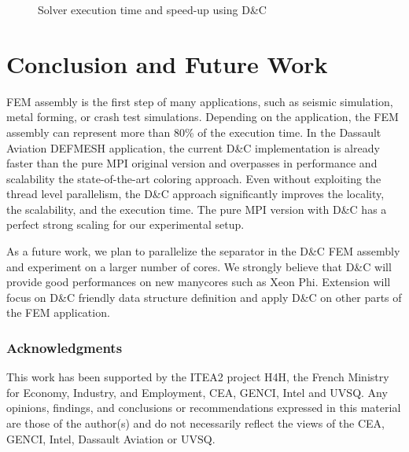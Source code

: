 \documentclass[10pt]{IOS-Book-Article}
\begin{document}
\begin{figure}[htp]
 \caption{Solver execution time and speed-up using D\&C}
 \label{fig:solCurves}
\end{figure}

\section{Conclusion and Future Work}
FEM assembly is the first step of many applications, such as seismic simulation, metal forming, or crash test simulations.
Depending on the application, the FEM assembly can represent more than 80\% of the execution time.
In the Dassault Aviation DEFMESH application, the current D\&C implementation is already faster than the pure MPI original version and overpasses in performance and scalability the state-of-the-art coloring approach.
Even without exploiting the thread level parallelism, the D\&C approach  significantly improves the locality, the scalability, and the execution time.
The pure MPI version with D\&C has a perfect strong scaling for our experimental setup.

As a future work, we plan to parallelize the separator in the D\&C FEM assembly and experiment on a larger number of cores.
We strongly believe that D\&C will provide good performances on new manycores such as Xeon Phi.
Extension will focus on D\&C friendly data structure definition and apply D\&C on other parts of the FEM application. 

\subsubsection*{Acknowledgments} \scriptsize{
This work has been supported by the ITEA2 project H4H, the French Ministry for Economy,
Industry, and Employment, CEA, GENCI, Intel and UVSQ.  Any opinions,
findings, and conclusions or recommendations expressed in this
material are those of the author(s) and do not necessarily reflect the
views of the CEA, GENCI, Intel, Dassault Aviation or UVSQ.}



\end{document}
